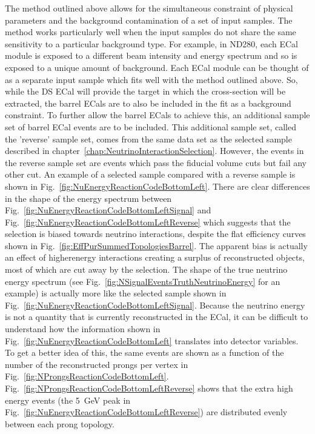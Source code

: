 The method outlined above allows for the simultaneous constraint of physical parameters and the background contamination of a set of input samples.  The method works particularly well when the input samples do not share the same sensitivity to a particular background type.  For example, in ND280, each ECal module is exposed to a different beam intensity and energy spectrum and so is exposed to a unique amount of  background.  Each ECal module can be thought of as a separate input sample which fits well with the method outlined above.  So, while the DS ECal will provide the target in which the cross-section will be extracted, the barrel ECals are to also be included in the fit as a background constraint.  To further allow the barrel ECals to achieve this, an additional sample set of barrel ECal events are to be included.  This additional sample set, called the 'reverse' sample set,  comes from the same data set as the selected sample described in chapter~\ref{chap:NeutrinoInteractionSelection}.  However, the events in the reverse sample set are events which pass the fiducial volume cuts but fail any other cut.  An example of a selected sample compared with a reverse sample is shown in Fig.~\ref{fig:NuEnergyReactionCodeBottomLeft}.  There are clear differences in the shape of the energy spectrum between Fig.~\ref{fig:NuEnergyReactionCodeBottomLeftSignal} and Fig.~\ref{fig:NuEnergyReactionCodeBottomLeftReverse} which suggests that the selection is biased towards  neutrino interactions, despite the flat efficiency curves shown in Fig.~\ref{fig:EffPurSummedTopologiesBarrel}. The apparent bias is actually an effect of higherenergy interactions creating a surplus of reconstructed objects, most of which are cut away by the selection.  The shape of the true neutrino energy spectrum (see Fig.~\ref{fig:NSignalEventsTruthNeutrinoEnergy} for an example) is actually more like the selected sample shown in Fig.~\ref{fig:NuEnergyReactionCodeBottomLeftSignal}.  Because the neutrino energy is not a quantity that is currently reconstructed in the ECal, it can be difficult to understand how the information shown in Fig.~\ref{fig:NuEnergyReactionCodeBottomLeft} translates into detector variables.  To get a better idea of this, the same events are shown as a function of the number of the reconstructed prongs per vertex in Fig.~\ref{fig:NProngsReactionCodeBottomLeft}.  Fig.~\ref{fig:NProngsReactionCodeBottomLeftReverse} shows that the extra high energy events (the 5~GeV peak in Fig.~\ref{fig:NuEnergyReactionCodeBottomLeftReverse}) are distributed evenly between each prong topology. 
